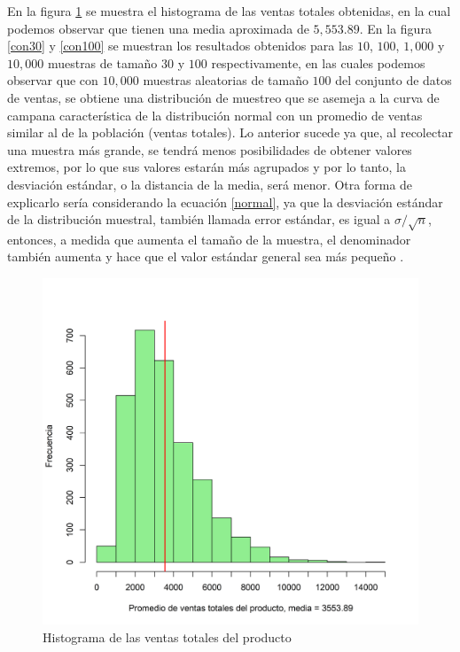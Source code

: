 \documentclass{article}
\begin{document}
En la figura \ref{inicial} se muestra el histograma de las ventas totales obtenidas, en la cual podemos observar que tienen una media aproximada de $5,553.89$. En la figura \ref{con30} y \ref{con100} se muestran los resultados obtenidos para las $10$, $100$, $1,000$ y $10,000$ muestras de tamaño $30$ y $100$ respectivamente, en las cuales podemos observar que con $10,000$ muestras aleatorias de tamaño $100$ del conjunto de datos de ventas, se obtiene una distribución de muestreo que se asemeja a la curva de campana característica de la distribución normal con un promedio de ventas similar al de la población (ventas totales). Lo anterior sucede ya que, al recolectar una muestra más grande, se tendrá menos posibilidades de obtener valores extremos, por lo que sus valores estarán más agrupados y por lo tanto, la desviación estándar, o la distancia de la media, será menor. Otra forma de explicarlo sería considerando la ecuación \ref{normal}, ya que la desviación estándar de la distribución muestral, también llamada error estándar, es igual a $\sigma / \sqrt{n}$, entonces, a medida que aumenta el tamaño de la muestra, el denominador también aumenta y hace que el valor estándar general sea más pequeño \cite{Bento}.

\begin{figure}[h]
\centering
\includegraphics[scale=0.6]{Figures/totalventas.png}
\caption{Histograma de las ventas totales del producto}
\label{inicial}
\end{figure}
    
\end{document}

